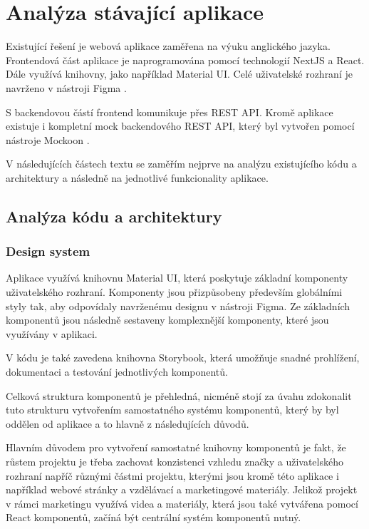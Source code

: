 \section{Analýza stávající aplikace}

Existující řešení je webová aplikace zaměřena na výuku anglického jazyka. Frontendová část aplikace je naprogramována pomocí technologií NextJS a React. Dále využívá knihovny, jako například Material UI. Celé uživatelské rozhraní je navrženo v nástroji Figma \cite{Jenicek2024BachelorThesis}.

S backendovou částí frontend komunikuje přes REST API. Kromě aplikace existuje i kompletní mock backendového REST API, který byl vytvořen pomocí nástroje Mockoon \cite{Jenicek2024BachelorThesis}.

V následujících částech textu se zaměřím nejprve na analýzu existujícího kódu a architektury a následně na jednotlivé funkcionality aplikace.

\subsection{Analýza kódu a architektury}



\subsubsection{Design system}

Aplikace využívá knihovnu Material UI, %
která poskytuje základní komponenty uživatelského rozhraní. Komponenty jsou přizpůsobeny především globálními styly tak, aby odpovídaly navrženému designu v nástroji Figma. Ze základních komponentů jsou následně sestaveny komplexnější komponenty, které jsou využívány v aplikaci. 

V kódu je také zavedena knihovna Storybook, která umožňuje snadné prohlížení, dokumentaci a testování jednotlivých komponentů.

Celková struktura komponentů je přehledná, nicméně stojí za úvahu zdokonalit tuto strukturu vytvořením samostatného systému komponentů, který by byl oddělen od aplikace a to hlavně z následujících důvodů.

Hlavním důvodem pro vytvoření samostatné knihovny komponentů je fakt, že růstem projektu je třeba zachovat konzistenci vzhledu značky a uživatelského rozhraní napříč různými částmi projektu, kterými jsou kromě této aplikace i například webové stránky a vzdělávací a marketingové materiály. Jelikož projekt v rámci marketingu využívá videa a materiály, která jsou také vytvářena pomocí React komponentů, začíná být centrální systém komponentů nutný.

